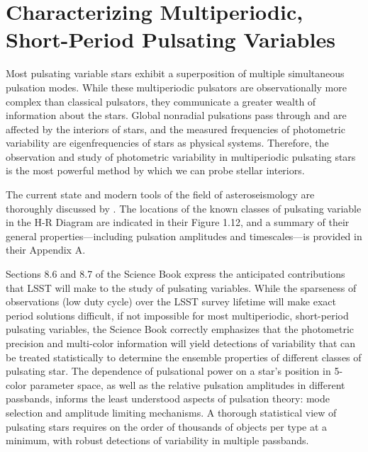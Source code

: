 %
%

\section{Characterizing Multiperiodic, Short-Period Pulsating Variables}
\def\secname{multiperiodicvariables}\label{sec:\secname}


Most pulsating variable stars exhibit a superposition of multiple
simultaneous pulsation modes.  While these multiperiodic pulsators are
observationally more complex than classical pulsators, they communicate
a greater wealth of information about the stars.  Global nonradial
pulsations pass through and are affected by the interiors of stars, and
the measured frequencies of photometric variability are eigenfrequencies
of stars as physical systems.  Therefore, the observation and study of
photometric variability in multiperiodic pulsating stars is the most
powerful method by which we can probe stellar interiors.

The current state and modern tools of the field of asteroseismology are
thoroughly discussed by \citet{2010aste.book.....A}.  The locations of
the known classes of pulsating variable in the H-R Diagram are indicated
in their Figure 1.12, and a summary of their general
properties---including pulsation amplitudes and timescales---is provided
in their Appendix A.

Sections 8.6 and 8.7 of the Science Book express the anticipated
contributions that LSST will make to the study of pulsating variables.
While the sparseness of observations (low duty cycle) over the LSST
survey lifetime will make exact period solutions difficult, if not impossible for
most multiperiodic, short-period pulsating variables, the Science Book
correctly emphasizes that the photometric precision and multi-color
information will yield detections of variability that can be treated
statistically to determine the ensemble properties of different classes
of pulsating star.  The dependence of pulsational power on a star's
position in 5-color parameter space, as well as the relative pulsation
amplitudes in different passbands, informs the least understood aspects
of pulsation theory: mode selection and amplitude limiting mechanisms. A
thorough statistical view of pulsating stars requires on the order of
thousands of objects per type at a minimum, with robust detections of
variability in multiple passbands.

